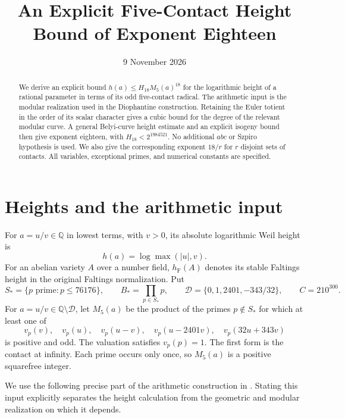 \documentclass[11pt,a4paper]{article}
\title{An Explicit Five-Contact Height Bound of Exponent Eighteen}
\author{}
\date{9 November 2026}
\theoremstyle{definition}
\newcommand{\Q}{\mathbb Q}
\newcommand{\hF}{h_{\mathrm F}}
\begin{document}
\maketitle
\begin{abstract}
We derive an explicit bound $h(a)\le H_{18}M_5(a)^{18}$ for the
logarithmic height of a rational parameter in terms of its odd
five-contact radical. The arithmetic input is the modular realization
used in the Diophantine construction. Retaining the Euler totient in
the order of its scalar character gives a cubic bound for the degree
of the relevant modular curve. A general Belyi-curve height estimate
and an explicit isogeny bound then give exponent eighteen, with
$H_{18}<2^{1984521}$. No additional $abc$ or Szpiro hypothesis is used.
We also give the corresponding exponent $18/r$ for $r$ disjoint
sets of contacts. All variables, exceptional primes, and numerical
constants are specified.
\end{abstract}

\section{Heights and the arithmetic input}

For $a=u/v\in\Q$ in lowest terms, with $v>0$, its absolute
logarithmic Weil height is
\[
 h(a)=\log\max(|u|,v).
\]
For an abelian variety $A$ over a number field, $\hF(A)$ denotes
its stable Faltings height in the original Faltings normalization.
Put
\[
 S_*=\{p\text{ prime}:p\le76176\},\qquad
 B_*=\prod_{p\in S_*}p,\qquad
 \mathcal D=\{0,1,2401,-343/32\},\qquad C=210^{300}.
\]
For $a=u/v\in\Q\setminus\mathcal D$, let $M_5(a)$ be the
product of the primes $p\notin S_*$ for which at least one of
\begin{equation}\label{eq:contacts}
 v_p(v),\quad v_p(u),\quad v_p(u-v),\quad
 v_p(u-2401v),\quad v_p(32u+343v)
\end{equation}
is positive and odd. The valuation satisfies $v_p(p)=1$.
The first form is the contact at infinity. Each prime occurs only
once, so $M_5(a)$ is a positive squarefree integer.

We use the following precise part of the arithmetic construction in
\cite[proof of \texttt{o8-height}, equations
\textup{(LR2)--(LR5)}, and proof of
\texttt{quartic-height19}]{Glazer}.
Stating this input explicitly separates the height calculation from
the geometric and modular realization on which it depends.
\end{document}
